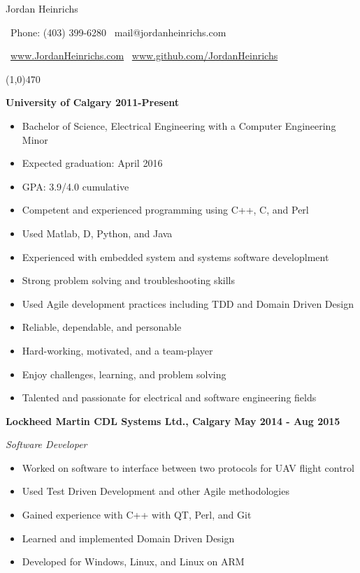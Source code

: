 \documentclass[12pt]{article}
\begin{document}

\centerline{{\Huge \sc Jordan Heinrichs}}
\medskip
\centerline{\textbullet\ Phone: (403) 399-6280 \hspace{5pt} \textbullet\ mail@jordanheinrichs.com}
\centerline{\textbullet\ \url{www.JordanHeinrichs.com}  \hspace{5pt} \textbullet\ \url{www.github.com/JordanHeinrichs}}
\noindent
\line(1,0){470}\\

\bigskip
{}
\medskip

\noindent \centerline{ \bf University of Calgary \hfill 2011-Present}
\begin{itemize}[parsep=0pt,partopsep=0pt]
  \item Bachelor of Science, Electrical Engineering with a Computer Engineering Minor
  \item Expected graduation: April 2016
  \item GPA: 3.9/4.0 cumulative
\end{itemize}

\bigskip
{}
\medskip
\begin{itemize}
\item Competent and experienced programming using C++, C, and Perl
\item Used Matlab, D, Python, and Java
\item Experienced with embedded system and systems software developlment
\item Strong problem solving and troubleshooting skills
\item Used Agile development practices including TDD and Domain Driven Design
\bigskip
\item Reliable, dependable, and personable
\item Hard-working, motivated, and a team-player
\item Enjoy challenges, learning, and problem solving
\item Talented and passionate for electrical and software engineering fields
\end{itemize}
\noindent

\bigskip
{}
\medskip

\noindent \centerline{ \bf Lockheed Martin CDL Systems Ltd., Calgary \hfill May 2014 - Aug 2015}
\indent \emph{ Software Developer }
\begin{itemize}
  \item Worked on software to interface between two protocols for UAV flight control
  \item Used Test Driven Development and other Agile methodologies
  \item Gained experience with C++ with QT, Perl, and Git
  \item Learned and implemented Domain Driven Design
  \item Developed for Windows, Linux, and Linux on ARM
\end{itemize}
\end{document}
